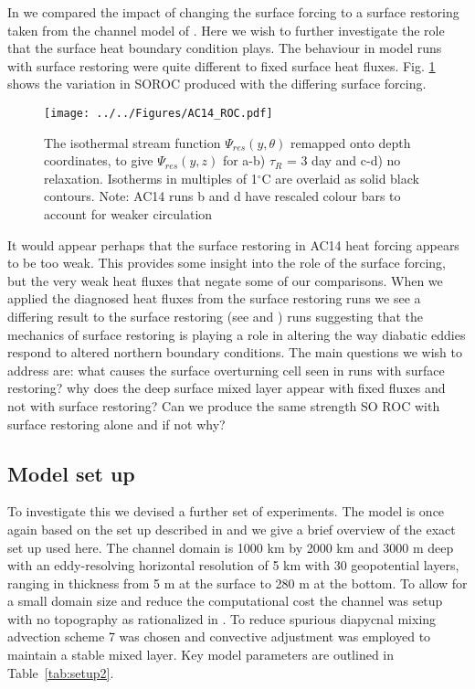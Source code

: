 In  we compared the impact of changing the surface forcing to a surface restoring taken from the channel model of \citet{Abernathey2014}. Here we wish to further investigate the role that the surface heat boundary condition plays. 
The behaviour in model runs with surface restoring were quite different to fixed surface heat fluxes. Fig. \ref{fig:AC14} shows the variation in SOROC produced with the differing surface forcing. 

\begin{figure}[H]
\center
\noindent \texttt{[image: ../../Figures/AC14\_ROC.pdf]} 
\caption{The isothermal stream function $\Psi_{res}(y,\theta)$ remapped onto depth coordinates, to give $\Psi_{res}(y,z)$ for a-b) $\tau _R$ = 3 day and c-d) no relaxation. Isotherms in multiples of 1$^{\circ}$C are overlaid as solid black contours. Note: AC14 runs b and d have rescaled colour bars to account for weaker circulation}
\label{fig:AC14}
\end{figure}

It would appear perhaps that the surface restoring in AC14 heat forcing appears to be too weak. This provides some insight into the role of the surface forcing, but the very weak heat fluxes that negate some of our comparisons. When we applied the diagnosed heat fluxes from the surface restoring runs we see a differing result to the surface restoring (see  and ) runs suggesting that the mechanics of surface restoring is playing a role in altering the way diabatic eddies respond to altered northern boundary conditions. The main questions we wish to address are: what causes the surface overturning cell seen in runs with surface restoring? why does the deep surface mixed layer appear with fixed fluxes and not with surface restoring? Can we produce the same strength SO ROC with surface restoring alone and if not why? 

\subsection{Model set up}
To investigate this we devised a further set of experiments. The model is once again based on the set up described in  and we give a brief overview of the exact set up used here. The channel domain is 1000 km by 2000 km and 3000 m deep with an eddy-resolving horizontal resolution of 5 km with 30 geopotential layers, ranging in thickness from 5 m at the surface to 280 m at the bottom.
To allow for a small domain size and reduce the computational cost the channel was setup with no topography as rationalized in \citet{Abernathey2011}. To reduce spurious diapycnal mixing advection scheme 7 was chosen \citep{hill2012, Ilıcak2012} and convective adjustment was employed to maintain a stable mixed layer. Key model parameters are outlined in Table~\ref{tab:setup2}.

